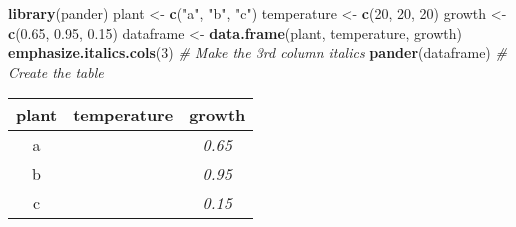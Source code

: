 \documentclass[]{article}
\newenvironment{Shaded}{\begin{snugshade}}{\end{snugshade}}
\newcommand{\CommentTok}[1]{\textcolor[rgb]{0.56,0.35,0.01}{\textit{#1}}}
\newcommand{\DecValTok}[1]{\textcolor[rgb]{0.00,0.00,0.81}{#1}}
\newcommand{\FloatTok}[1]{\textcolor[rgb]{0.00,0.00,0.81}{#1}}
\newcommand{\KeywordTok}[1]{\textcolor[rgb]{0.13,0.29,0.53}{\textbf{#1}}}
\newcommand{\NormalTok}[1]{#1}
\newcommand{\StringTok}[1]{\textcolor[rgb]{0.31,0.60,0.02}{#1}}
\begin{document}
\begin{Shaded}
\begin{Highlighting}[]
\KeywordTok{library}\NormalTok{(pander)}
\NormalTok{plant <-}\StringTok{ }\KeywordTok{c}\NormalTok{(}\StringTok{"a"}\NormalTok{, }\StringTok{"b"}\NormalTok{, }\StringTok{"c"}\NormalTok{)}
\NormalTok{temperature <-}\StringTok{ }\KeywordTok{c}\NormalTok{(}\DecValTok{20}\NormalTok{, }\DecValTok{20}\NormalTok{, }\DecValTok{20}\NormalTok{)}
\NormalTok{growth <-}\StringTok{ }\KeywordTok{c}\NormalTok{(}\FloatTok{0.65}\NormalTok{, }\FloatTok{0.95}\NormalTok{, }\FloatTok{0.15}\NormalTok{)}
\NormalTok{dataframe <-}\StringTok{ }\KeywordTok{data.frame}\NormalTok{(plant, temperature, growth)}
\KeywordTok{emphasize.italics.cols}\NormalTok{(}\DecValTok{3}\NormalTok{)   }\CommentTok{# Make the 3rd column italics}
\KeywordTok{pander}\NormalTok{(dataframe)           }\CommentTok{# Create the table}
\end{Highlighting}
\end{Shaded}

\begin{longtable}[]{@{}ccc@{}}
\toprule
\begin{minipage}[b]{0.10\columnwidth}\centering
plant\strut
\end{minipage} & \begin{minipage}[b]{0.18\columnwidth}\centering
temperature\strut
\end{minipage} & \begin{minipage}[b]{0.11\columnwidth}\centering
growth\strut
\end{minipage}\tabularnewline
\midrule
\endhead
\begin{minipage}[t]{0.10\columnwidth}\centering
a\strut
\end{minipage} & \begin{minipage}[t]{0.18\columnwidth}\centering
20\strut
\end{minipage} & \begin{minipage}[t]{0.11\columnwidth}\centering
\emph{0.65}\strut
\end{minipage}\tabularnewline
\begin{minipage}[t]{0.10\columnwidth}\centering
b\strut
\end{minipage} & \begin{minipage}[t]{0.18\columnwidth}\centering
20\strut
\end{minipage} & \begin{minipage}[t]{0.11\columnwidth}\centering
\emph{0.95}\strut
\end{minipage}\tabularnewline
\begin{minipage}[t]{0.10\columnwidth}\centering
c\strut
\end{minipage} & \begin{minipage}[t]{0.18\columnwidth}\centering
20\strut
\end{minipage} & \begin{minipage}[t]{0.11\columnwidth}\centering
\emph{0.15}\strut
\end{minipage}\tabularnewline
\bottomrule
\end{longtable}
\end{document}
